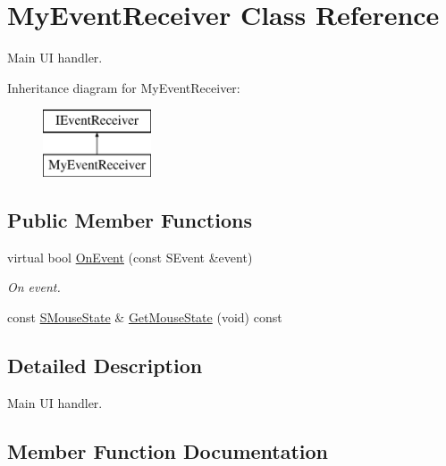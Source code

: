 \hypertarget{class_my_event_receiver}{}\section{My\+Event\+Receiver Class Reference}
\label{class_my_event_receiver}


Main UI handler.  


Inheritance diagram for My\+Event\+Receiver\+:\begin{figure}[H]
\begin{center}
\leavevmode
\includegraphics[height=2.000000cm]{class_my_event_receiver}
\end{center}
\end{figure}
\subsection*{Public Member Functions}
\begin{DoxyCompactItemize}
\item 
virtual bool \hyperlink{class_my_event_receiver_aea4aee9bbe18deae0c33ad4c6c32d7f1}{On\+Event} (const S\+Event \&event)
\begin{DoxyCompactList}\small\item\em On event. \end{DoxyCompactList}\item 
const \hyperlink{struct_s_mouse_state}{S\+Mouse\+State} \& \hyperlink{class_my_event_receiver_a8fb089e7c1648013762442e4676c4d91}{Get\+Mouse\+State} (void) const
\end{DoxyCompactItemize}


\subsection{Detailed Description}
Main UI handler. 

\subsection{Member Function Documentation}
\mbox{\label{class_my_event_receiver_a8fb089e7c1648013762442e4676c4d91}} 
